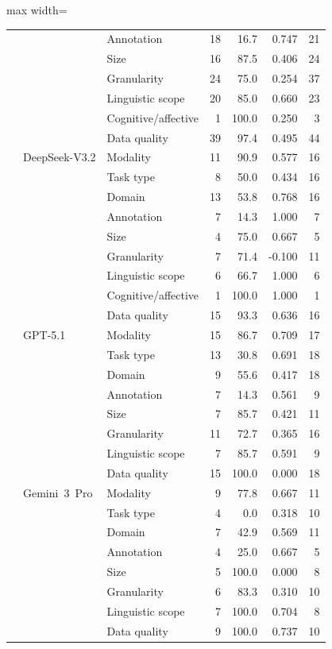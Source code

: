 \begin{table}[H]
\begin{adjustbox}{max width=\textwidth}
\begin{tabular}{l l l r r r r}
 &  & Annotation & 18 & 16.7 & 0.747 & 21 \\
 &  & Size & 16 & 87.5 & 0.406 & 24 \\
 &  & Granularity & 24 & 75.0 & 0.254 & 37 \\
 &  & Linguistic scope & 20 & 85.0 & 0.660 & 23 \\
 &  & Cognitive/affective & 1 & 100.0 & 0.250 & 3 \\
 &  & Data quality & 39 & 97.4 & 0.495 & 44 \\
 & DeepSeek-V3.2 & Modality & 11 & 90.9 & 0.577 & 16 \\
 &  & Task type & 8 & 50.0 & 0.434 & 16 \\
 &  & Domain & 13 & 53.8 & 0.768 & 16 \\
 &  & Annotation & 7 & 14.3 & 1.000 & 7 \\
 &  & Size & 4 & 75.0 & 0.667 & 5 \\
 &  & Granularity & 7 & 71.4 & -0.100 & 11 \\
 &  & Linguistic scope & 6 & 66.7 & 1.000 & 6 \\
 &  & Cognitive/affective & 1 & 100.0 & 1.000 & 1 \\
 &  & Data quality & 15 & 93.3 & 0.636 & 16 \\
 & GPT-5.1 & Modality & 15 & 86.7 & 0.709 & 17 \\
 &  & Task type & 13 & 30.8 & 0.691 & 18 \\
 &  & Domain & 9 & 55.6 & 0.417 & 18 \\
 &  & Annotation & 7 & 14.3 & 0.561 & 9 \\
 &  & Size & 7 & 85.7 & 0.421 & 11 \\
 &  & Granularity & 11 & 72.7 & 0.365 & 16 \\
 &  & Linguistic scope & 7 & 85.7 & 0.591 & 9 \\
 &  & Data quality & 15 & 100.0 & 0.000 & 18 \\
 & Gemini~3~Pro & Modality & 9 & 77.8 & 0.667 & 11 \\
 &  & Task type & 4 & 0.0 & 0.318 & 10 \\
 &  & Domain & 7 & 42.9 & 0.569 & 11 \\
 &  & Annotation & 4 & 25.0 & 0.667 & 5 \\
 &  & Size & 5 & 100.0 & 0.000 & 8 \\
 &  & Granularity & 6 & 83.3 & 0.310 & 10 \\
 &  & Linguistic scope & 7 & 100.0 & 0.704 & 8 \\
 &  & Data quality & 9 & 100.0 & 0.737 & 10 \\

\end{tabular}
\end{adjustbox}
\end{table}
